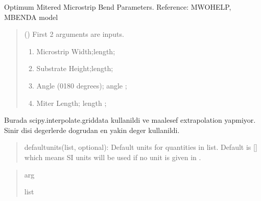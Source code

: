 \documentclass[letterpaper,10pt,english]{sphinxmanual}
\begin{document}

\begin{fulllineitems}
\label{\detokenize{components:components.OptimumMiteredArbitraryAngleMicrostripBend}}
\pysigstartsignatures
{}
\pysigstopsignatures
\sphinxAtStartPar
Optimum Mitered Microstrip Bend Parameters.
Reference: MWOHELP, MBENDA model
\begin{quote}\begin{description}
\sphinxAtStartPar
{} () \textendash{}
\sphinxAtStartPar
First 2 arguments are inputs.
\begin{enumerate}
%
\item {}
\sphinxAtStartPar
Microstrip Width;length;

\item {}
\sphinxAtStartPar
Substrate Height;length;

\item {}
\sphinxAtStartPar
Angle (0\sphinxhyphen{}180 degrees); angle ;

\item {}
\sphinxAtStartPar
Miter Length; length ;

\end{enumerate}


\end{description}\end{quote}

\sphinxAtStartPar
Burada scipy.interpolate.griddata kullanildi ve maalesef extrapolation yapmiyor. Sinir disi degerlerde dogrudan en yakin deger kullanildi.
\begin{quote}

\sphinxAtStartPar
defaultunits(list, optional): Default units for quantities in  list. Default is {[}{]} which means SI units will be used if no unit is given in .
\end{quote}
\begin{quote}\begin{description}
\sphinxAtStartPar
arg

\sphinxAtStartPar
list

\end{description}\end{quote}

\end{fulllineitems}
\end{document}
